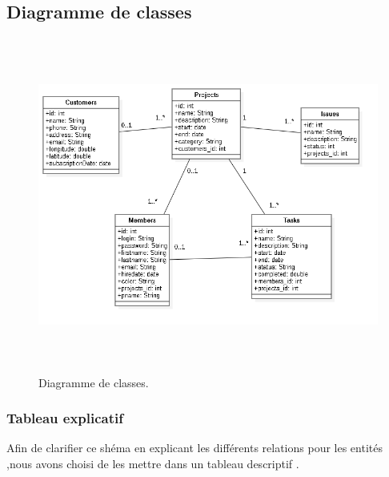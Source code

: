\subsection{Diagramme de classes}

\begin{figure}[H]
\center
\includegraphics[width=13cm,height=11cm]{./figures/class.png}
\caption{Diagramme de classes.}

\end{figure}
\FloatBarrier

\subsubsection{Tableau explicatif}

Afin de clarifier ce sh\'{e}ma en explicant les diff\'{e}rents relations pour les
entit\'{e}s ,nous avons choisi de les mettre dans un tableau descriptif .
\FloatBarrier

